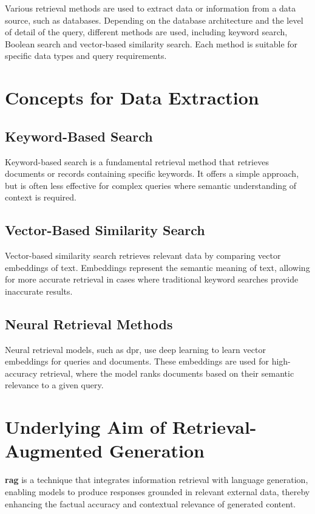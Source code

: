 Various retrieval methods are used to extract data or information from a data source, such as databases. 
Depending on the database architecture and the level of detail of the query, different methods are used, including keyword search, Boolean search and vector-based similarity search. Each method is suitable for specific data types and query requirements.
\section{Concepts for Data Extraction}\label{sec:data-extraction-concepts}

\subsection{Keyword-Based Search}\label{sec:keyword-search}
Keyword-based search is a fundamental retrieval method that retrieves documents or records containing specific keywords. 
It offers a simple approach, but is often less effective for complex queries where semantic understanding of context is required.

\subsection{Vector-Based Similarity Search}\label{sec:vector-similarity-search}
Vector-based similarity search retrieves relevant data by comparing vector embeddings of text. 
Embeddings represent the semantic meaning of text, allowing for more accurate retrieval in cases where traditional keyword searches provide inaccurate results.

\subsection{Neural Retrieval Methods}\label{sec:neural-retrieval}
Neural retrieval models, such as \ac{dpr}, use deep learning to learn vector embeddings for queries and documents. 
These embeddings are used for high-accuracy retrieval, where the model ranks documents based on their semantic relevance to a given query.

\section{Underlying Aim of Retrieval-Augmented Generation}\label{sec:aim-of-rag}

\begin{definition}\label{def:rag}
    \textbf{\ac{rag}} is a technique that integrates information retrieval with language generation, enabling models to produce responses grounded in relevant external data, thereby enhancing the factual accuracy and contextual relevance of generated content.
\end{definition}


